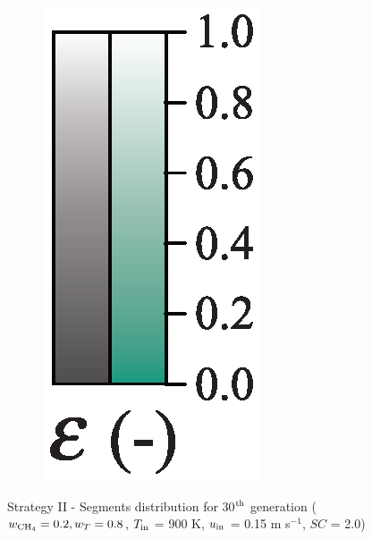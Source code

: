 \documentclass[preprint,12pt]{elsarticle}
\begin{document}
\begin{figure}
\begin{subfigure}[b]{0.1\textwidth}
     	\includegraphics[width=\textwidth]{segments_porosity.eps}
     \end{subfigure}
\caption{\label{fig:30L6040G1-TField} Strategy II - Segments distribution for 30$^{\rm{th}}$ generation ($w_{\rm{CH_4}} = 0.2, w_T = 0.8$, $T_{\rm{in}}$ = 900 K, $u_{\rm{in}}$ = 0.15 m s$^{-1}$, $SC$ = 2.0)}
\end{figure}
\end{document}
